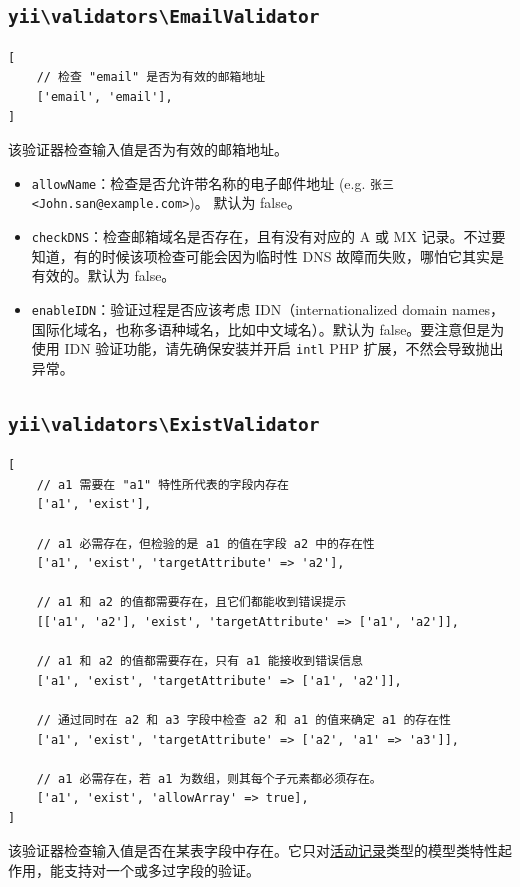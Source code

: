 \subsection{\texttt{yii{\allowbreak{}\textbackslash}validators{\allowbreak{}\textbackslash}EmailValidator} \label{tutorial-core-validators.md::email}}
\lstset{language=php}\begin{lstlisting}
[
    // 检查 "email" 是否为有效的邮箱地址
    ['email', 'email'],
]
\end{lstlisting}
该验证器检查输入值是否为有效的邮箱地址。

\begin{itemize}
\item \lstinline|allowName|：检查是否允许带名称的电子邮件地址 (e.g. \lstinline|张三 <John.san@example.com>|)。 默认为 false。
\item \lstinline|checkDNS|：检查邮箱域名是否存在，且有没有对应的 A 或 MX 记录。不过要知道，有的时候该项检查可能会因为临时性 DNS 故障而失败，哪怕它其实是有效的。默认为 false。
\item \lstinline|enableIDN|：验证过程是否应该考虑 IDN（internationalized domain names，国际化域名，也称多语种域名，比如中文域名）。默认为 false。要注意但是为使用 IDN 验证功能，请先确保安装并开启 \lstinline|intl| PHP 扩展，不然会导致抛出异常。
\end{itemize}
\subsection{\texttt{yii{\allowbreak{}\textbackslash}validators{\allowbreak{}\textbackslash}ExistValidator} \label{tutorial-core-validators.md::exist}}
\lstset{language=php}\begin{lstlisting}
[
    // a1 需要在 "a1" 特性所代表的字段内存在
    ['a1', 'exist'],

    // a1 必需存在，但检验的是 a1 的值在字段 a2 中的存在性
    ['a1', 'exist', 'targetAttribute' => 'a2'],

    // a1 和 a2 的值都需要存在，且它们都能收到错误提示
    [['a1', 'a2'], 'exist', 'targetAttribute' => ['a1', 'a2']],

    // a1 和 a2 的值都需要存在，只有 a1 能接收到错误信息
    ['a1', 'exist', 'targetAttribute' => ['a1', 'a2']],

    // 通过同时在 a2 和 a3 字段中检查 a2 和 a1 的值来确定 a1 的存在性
    ['a1', 'exist', 'targetAttribute' => ['a2', 'a1' => 'a3']],

    // a1 必需存在，若 a1 为数组，则其每个子元素都必须存在。
    ['a1', 'exist', 'allowArray' => true],
]
\end{lstlisting}
该验证器检查输入值是否在某表字段中存在。它只对\hyperref[db-active-record.md]{活动记录}类型的模型类特性起作用，能支持对一个或多过字段的验证。

